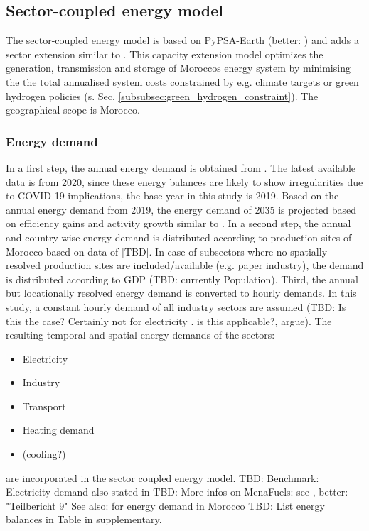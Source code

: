 \subsection{Sector-coupled energy model}
\label{subsec:moroccan_model}

The sector-coupled energy model is based on PyPSA-Earth \cite{Parzen2022} (better: \cite{Parzen2023a}) and adds a sector extension similar to \cite{Brown2018a}.
This capacity extension model optimizes the generation, transmission and storage of Moroccos energy system by minimising the the total annualised system costs
constrained by e.g. climate targets or green hydrogen policies (s. Sec. \ref{subsubsec:green_hydrogen_constraint}). The geographical scope is Morocco.

\subsubsection{Energy demand}
In a first step, the annual energy demand is obtained from \cite{unstats2023}. The latest available data is from 2020, since these energy balances are likely to show irregularities due to COVID-19 implications, the base year in this study is 2019. Based on the annual energy demand from 2019, the energy demand of 2035 is projected based on efficiency gains and activity growth similar to \cite{Mueller2023}.
In a second step, the annual and country-wise energy demand is distributed according to production sites of Morocco based on data of [TBD]. In case of subsectors where no spatially resolved production sites are included/available (e.g. paper industry), the demand is distributed according to GDP (TBD: currently Population). Third, the annual but locationally resolved energy demand is converted to hourly demands. In this study, a constant hourly demand of all industry sectors are assumed (TBD: Is this the case? Certainly not for electricity \cite{Parzen2022}. is this applicable?, argue).
The resulting temporal and spatial energy demands of the sectors:
\begin{itemize}
    \item Electricity
    \item Industry
    \item Transport
    \item Heating demand 
    \item (cooling?) 
\end{itemize}
are incorporated in the sector coupled energy model.
TBD: Benchmark: Electricity demand also stated in \cite[primary source 25]{Boulakhbar2020}
TBD: More infos on MenaFuels: see \cite[p. 35]{Ersoy2022}, better: "Teilbericht 9"
See also: \cite{Bennouna2016} for energy demand in Morocco
TBD: List energy balances in Table in supplementary.



